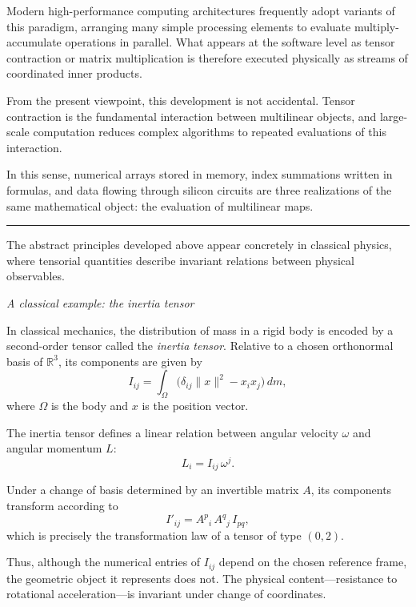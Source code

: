 \medskip

Modern high-performance computing architectures frequently adopt variants of
this paradigm, arranging many simple processing elements to evaluate
multiply-accumulate operations in parallel.
What appears at the software level as tensor contraction or matrix
multiplication is therefore executed physically as streams of coordinated inner
products.

\medskip

From the present viewpoint, this development is not accidental.
Tensor contraction is the fundamental interaction between multilinear objects,
and large-scale computation reduces complex algorithms to repeated evaluations
of this interaction.

\medskip

In this sense, numerical arrays stored in memory, index summations written in
formulas, and data flowing through silicon circuits are three realizations of
the same mathematical object: the evaluation of multilinear maps.

\medskip
\hrule
\bigskip

The abstract principles developed above appear concretely in classical physics,
where tensorial quantities describe invariant relations between physical
observables.

\medskip

\textit{A classical example: the inertia tensor \cite{feynman}}

In classical mechanics, the distribution of mass in a rigid body is encoded by
a second-order tensor called the \emph{inertia tensor}.
Relative to a chosen orthonormal basis of $\mathbb{R}^3$, its components are
given by
\[
I_{ij} = \int_{\Omega}
\big( \delta_{ij} \|x\|^2 - x_i x_j \big)\, dm,
\]
where $\Omega$ is the body and $x$ is the position vector.

\medskip

The inertia tensor defines a linear relation between angular velocity $\omega$
and angular momentum $L$:
\[
L_i = I_{ij} \, \omega^j.
\]

\medskip

Under a change of basis determined by an invertible matrix $A$, its components
transform according to
\[
I'_{ij}
=
A^{p}{}_{i} \,
A^{q}{}_{j} \,
I_{pq},
\]
which is precisely the transformation law of a tensor of type $(0,2)$.

\medskip

Thus, although the numerical entries of $I_{ij}$ depend on the chosen reference
frame, the geometric object it represents does not.
The physical content---resistance to rotational acceleration---is invariant
under change of coordinates.


